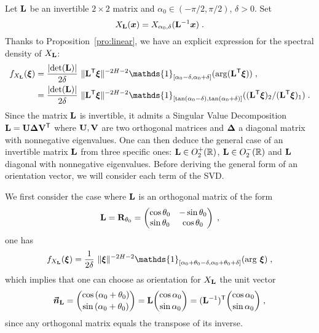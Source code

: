 \documentclass{elsarticle}
\begin{document}
Let $\mathbf{L}$ be an invertible $2\times 2$ matrix and $\alpha_0\in (-\pi/2,\pi/2)$, $\delta>0$. Set
\begin{equation}\label{e:XL}
X_{\mathbf{L}}(\bm{x})=X_{\alpha_0,\delta}(\mathbf{L}^{-1}\bm{x})\;.
\end{equation}
Thanks to Proposition~\ref{pro:linear}, we have an explicit expression for the spectral density of $X_{\mathbf{L}}$:
\begin{align*}
f_{X_{\mat{L}}}(\vect{\xi})
&=\frac{\lvert \mathrm{det}(\mat{L})\rvert}{2\delta} ~ \lVert \mat{L}^{\T} \vect{\xi}\rVert^{-2H-2}\mathds{1}_{[\alpha_0-\delta, \alpha_0+\delta]}(\mathrm{arg}(\mat{L}^{\T}\vect{\xi}))\;,\\
&=\frac{\lvert \mathrm{det}(\mat{L})\rvert}{2\delta} ~\lVert \mat{L}^{\T} \vect{\xi}\rVert ^{-2H-2}\mathds{1}_{[\tan(\alpha_0-\delta),\tan(\alpha_0+\delta)]}((\mat{L}^{\T}\vect{\xi})_2/(\mat{L}^{\T}\vect{\xi})_1)\;.
\end{align*}
Since the matrix $\mathbf{L}$ is invertible, it admits a Singular Value Decomposition $\mathbf{L}=\mathbf{U} \mathbf{\Delta} \mathbf{V}^{\mathsf{T}}$ where $\mathbf{U},\mathbf{V}$ are two orthogonal matrices and $\mathbf{\Delta}$ a diagonal matrix with nonnegative eigenvalues. One can then deduce the general case of an invertible matrix $\mathbf{L}$ from three specific ones: $\mathbf{L}\in O^+_2(\mathbb{R})$, $\mathbf{L}\in O^-_2(\mathbb{R})$ and $\mathbf{L}$ diagonal with nonnegative eigenvalues. Before deriving the general form of an orientation vector, we will consider each term of the SVD.

\medskip

 We first consider the case where $\mathbf{L}$ is an orthogonal matrix of the form 
\[
\mathbf{L}=\mathbf{R}_{\theta_0}=\begin{pmatrix}\cos \theta_0&-\sin \theta_0 \\ \sin \theta_0 &\cos \theta_0\end{pmatrix}\;,
\]
one has 
\[
f_{X_{\mat{L}}}(\vect{\xi})=\frac{1}{2\delta}~\lVert \vect{\xi}\rVert^{-2H-2}\mathds{1}_{[\alpha_0+\theta_0-\delta,\alpha_0+\theta_0+\delta]}(\mathrm{arg}~\vect{\xi})\;,
\]
which implies that one can choose as orientation for $X_{\mathbf{L}}$ the unit vector
\begin{equation}\label{e:orth1}
\bm{\vec n}_{\mathbf{L}}=\binom{\cos \left(\alpha_0+\theta_0\right)}{\sin \left(\alpha_0+\theta_0\right)}=\mathbf{L} \binom{\cos \alpha_0}{\sin\alpha_0}=(\mathbf{L}^{-1})^{\mathsf{T}} \binom{\cos \alpha_0}{\sin \alpha_0}\;,
\end{equation}
since any orthogonal matrix equals the transpose of its inverse.
\end{document}
